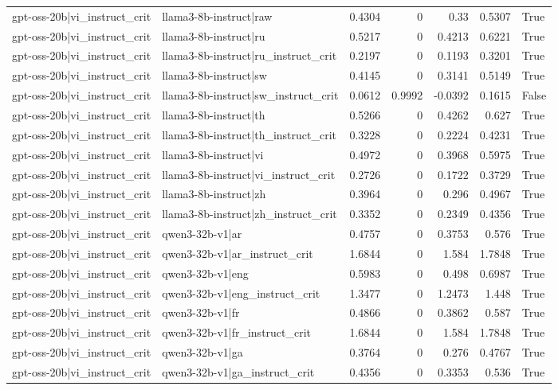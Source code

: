 \begin{table}
\begin{tabular}{l l r r r r l}
gpt-oss-20b|vi_instruct_crit & llama3-8b-instruct|raw & 0.4304 & 0 & 0.33 & 0.5307 & True \\
gpt-oss-20b|vi_instruct_crit & llama3-8b-instruct|ru & 0.5217 & 0 & 0.4213 & 0.6221 & True \\
gpt-oss-20b|vi_instruct_crit & llama3-8b-instruct|ru_instruct_crit & 0.2197 & 0 & 0.1193 & 0.3201 & True \\
gpt-oss-20b|vi_instruct_crit & llama3-8b-instruct|sw & 0.4145 & 0 & 0.3141 & 0.5149 & True \\
gpt-oss-20b|vi_instruct_crit & llama3-8b-instruct|sw_instruct_crit & 0.0612 & 0.9992 & -0.0392 & 0.1615 & False \\
gpt-oss-20b|vi_instruct_crit & llama3-8b-instruct|th & 0.5266 & 0 & 0.4262 & 0.627 & True \\
gpt-oss-20b|vi_instruct_crit & llama3-8b-instruct|th_instruct_crit & 0.3228 & 0 & 0.2224 & 0.4231 & True \\
gpt-oss-20b|vi_instruct_crit & llama3-8b-instruct|vi & 0.4972 & 0 & 0.3968 & 0.5975 & True \\
gpt-oss-20b|vi_instruct_crit & llama3-8b-instruct|vi_instruct_crit & 0.2726 & 0 & 0.1722 & 0.3729 & True \\
gpt-oss-20b|vi_instruct_crit & llama3-8b-instruct|zh & 0.3964 & 0 & 0.296 & 0.4967 & True \\
gpt-oss-20b|vi_instruct_crit & llama3-8b-instruct|zh_instruct_crit & 0.3352 & 0 & 0.2349 & 0.4356 & True \\
gpt-oss-20b|vi_instruct_crit & qwen3-32b-v1|ar & 0.4757 & 0 & 0.3753 & 0.576 & True \\
gpt-oss-20b|vi_instruct_crit & qwen3-32b-v1|ar_instruct_crit & 1.6844 & 0 & 1.584 & 1.7848 & True \\
gpt-oss-20b|vi_instruct_crit & qwen3-32b-v1|eng & 0.5983 & 0 & 0.498 & 0.6987 & True \\
gpt-oss-20b|vi_instruct_crit & qwen3-32b-v1|eng_instruct_crit & 1.3477 & 0 & 1.2473 & 1.448 & True \\
gpt-oss-20b|vi_instruct_crit & qwen3-32b-v1|fr & 0.4866 & 0 & 0.3862 & 0.587 & True \\
gpt-oss-20b|vi_instruct_crit & qwen3-32b-v1|fr_instruct_crit & 1.6844 & 0 & 1.584 & 1.7848 & True \\
gpt-oss-20b|vi_instruct_crit & qwen3-32b-v1|ga & 0.3764 & 0 & 0.276 & 0.4767 & True \\
gpt-oss-20b|vi_instruct_crit & qwen3-32b-v1|ga_instruct_crit & 0.4356 & 0 & 0.3353 & 0.536 & True \\

\end{tabular}
\end{table}
